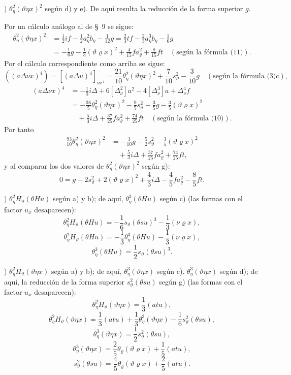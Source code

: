 \documentclass[11pt]{article}
\newcommand{\A}{\Delta}
\newcommand{\R}{\varrho}
\begin{document}
) $\theta_\eta^2(\vartheta\eta x)^2$ según d) y e). De aquí resulta la reducción de la forma superior $g$.

Por un cálculo análogo al de \S\ 9 se sigue:
\[
\begin{aligned}
\theta_\eta^2(\vartheta\eta x)^2
&=\frac12 i f-\frac12a_\eta^2b_\eta-\frac1{12}g
=\frac23tf-\frac23a_\eta^3b_\eta-\frac16g\\
&=-\frac16g-\frac13(\vartheta\R x)^2+\frac4{15}fa_\R^2+\frac8{15}ft
\quad(\text{según la fórmula (11)}).
\end{aligned}
\]
Por el cálculo correspondiente como arriba se sigue:
\[
((a\A\nu x)^4)=[(a\A u)^4]_{\nu x^4}
=\frac{21}{10}\theta_\eta^2(\vartheta\eta x)^2+\frac7{10}s_\vartheta^2-\frac3{10}g
\quad(\text{según la fórmula (3)c}),
\]
\[
\begin{aligned}
(a\A\nu x)^4&=-\frac13i\A+6[\A_\nu^2]a^2-4[\A_\nu^3]a+\A_\nu^4f\\
&= -\frac{36}{5}\theta_\eta^2(\vartheta\eta x)^2-\frac95s_\vartheta^2-\frac35g-\frac35(\vartheta\R x)^2\\
&\quad+\frac53i\A+\frac{37}{25}fa_\R^2+\frac{74}{25}ft\quad(\text{según la fórmula (10)}).
\end{aligned}
\]
Por tanto
\[
\begin{aligned}
\frac{93}{10}\theta_\eta^2(\vartheta\eta x)^2
&=-\frac3{10}g-\frac52s_\vartheta^2-\frac35(\vartheta\R x)^2\\
&\quad+\frac53i\A+\frac{37}{25}fa_\R^2+\frac{74}{25}ft,
\end{aligned}
\]
y al comparar los dos valores de $\theta_\eta^2(\vartheta\eta x)^2$ según g):
\[
\tag{13}
0=g-2s_\vartheta^2+2(\vartheta\R x)^2+\frac43i\A-\frac45fa_\R^2-\frac85ft.
\]

) $\theta_\eta^2H_\vartheta(\theta Hu)$ según a) y b); de aquí, $\theta_\eta^3(\theta Hu)$ según c) (las formas con el factor $u_x$ desaparecen):
\[
\theta_\eta^2H_\vartheta(\theta Hu)=-\frac16s_\vartheta(\theta su)^3-\frac13(\nu\R x),
\]
\[
\theta_\eta^2H_\vartheta(\theta Hu)=-\frac13\theta_\eta^3(\theta Hu)-\frac13(\nu\R x),
\]
\[
\theta_\eta^3(\theta Hu)=\frac12s_\vartheta(\theta su)^3.
\]

) $\theta_\eta^2H_\vartheta(\vartheta\eta x)$ según a) y b); de aquí, $\theta_\eta^3(\vartheta\eta x)$ según c). $\theta_\eta^3(\vartheta\eta x)$ según d); de aquí, la reducción de la forma superior $s_\vartheta^2(\theta su)$ según g) (las formas con el factor $u_x$ desaparecen):
\[
\theta_\eta^2H_\vartheta(\vartheta\eta x)=\frac13(atu),
\]
\[
\theta_\eta^2H_\vartheta(\vartheta\eta x)=\frac13(atu)+\frac13\theta_\eta^3(\vartheta\eta x)-\frac16s_\vartheta^2(\theta su),
\]
\[
\theta_\eta^3(\vartheta\eta x)=\frac12s_\vartheta^2(\theta su),
\]
\[
\theta_\eta^3(\vartheta\eta x)=\frac25\theta_\R(\vartheta\R x)+\frac15(atu),
\]
\[
\tag{14}
s_\vartheta^2(\theta su)=\frac45\theta_\R(\vartheta\R x)+\frac25(atu).
\]
\end{document}
